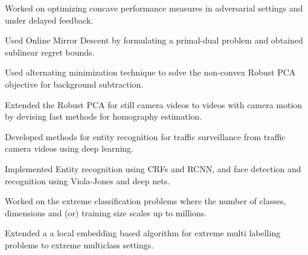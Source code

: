 \documentclass[US paper]{deedy-resume} %
\begin{document}
\begin{tightitemize}
\item Worked on optimizing concave performance measures in adversarial settings and under delayed feedback.
\item Used Online Mirror Descent by formulating a primal-dual problem and obtained sublinear regret bounds.
\end{tightitemize}
\vspace{1mm}



\begin{tightitemize}
\item Used alternating minimization technique to solve the non-convex Robust PCA objective for background subtraction.
\item Extended the Robust PCA for still camera videos to videos with camera motion by devising fast methods for homography estimation.
\end{tightitemize}
\vspace{1mm}



\begin{tightitemize}
\item Developed methods for entity recognition for traffic surveillance from traffic camera videos using deep learning.
\item Implemented Entity recognition using CRFs and RCNN, and face detection and recognition using Viola-Jones and deep nets.
\end{tightitemize}
\vspace{1mm}

\begin{tightitemize}
\item Worked on the extreme classification problems where the number of classes, dimensions and (or) training size scales up to millions.
\item Extended a a local embedding based algorithm for extreme multi labelling problems to extreme multiclass settings.
\end{tightitemize}
\end{document}
